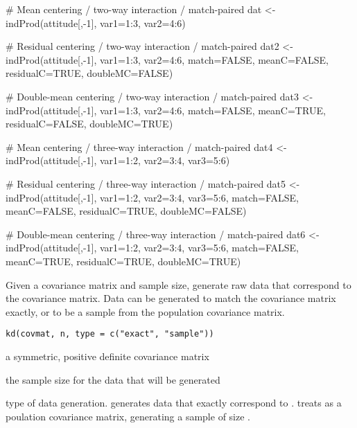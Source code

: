 \documentclass[a4paper]{book}
\begin{document}
\begin{Examples}
\begin{ExampleCode}
# Mean centering / two-way interaction / match-paired
dat <- indProd(attitude[,-1], var1=1:3, var2=4:6)

# Residual centering / two-way interaction / match-paired
dat2 <- indProd(attitude[,-1], var1=1:3, var2=4:6, match=FALSE, meanC=FALSE, 
	residualC=TRUE, doubleMC=FALSE)

# Double-mean centering / two-way interaction / match-paired
dat3 <- indProd(attitude[,-1], var1=1:3, var2=4:6, match=FALSE, meanC=TRUE, 
	residualC=FALSE, doubleMC=TRUE)

# Mean centering / three-way interaction / match-paired
dat4 <- indProd(attitude[,-1], var1=1:2, var2=3:4, var3=5:6)

# Residual centering / three-way interaction / match-paired
dat5 <- indProd(attitude[,-1], var1=1:2, var2=3:4, var3=5:6, match=FALSE, meanC=FALSE, 
	residualC=TRUE, doubleMC=FALSE)

# Double-mean centering / three-way interaction / match-paired
dat6 <- indProd(attitude[,-1], var1=1:2, var2=3:4, var3=5:6, match=FALSE, meanC=TRUE, 
	residualC=TRUE, doubleMC=TRUE)
\end{ExampleCode}
\end{Examples}
%
\begin{Description}\relax
Given a covariance matrix and sample size, generate raw data that
correspond to the covariance matrix.  Data can be generated to match the
covariance matrix exactly, or to be a sample from the population
covariance matrix.
\end{Description}
%
\begin{Usage}
\begin{verbatim}
kd(covmat, n, type = c("exact", "sample"))
\end{verbatim}
\end{Usage}
%
\begin{Arguments}
\begin{ldescription}
\item[\code{covmat}] a symmetric, positive definite covariance matrix
\item[\code{n}] the sample size for the data that will be generated
\item[\code{type}] type of data generation.  generates data that
exactly correspond to .   treats
 as a poulation covariance matrix, generating a sample
of size .
\end{ldescription}
\end{Arguments}
\end{document}
